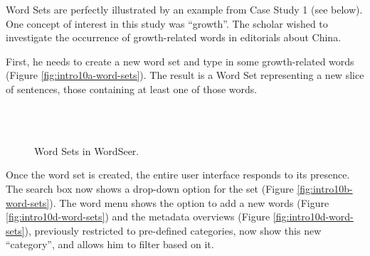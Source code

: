 \documentclass{sig-alternate}
\begin{document}
Word Sets are perfectly illustrated by an example from Case Study 1 (see below). One concept of interest in this study was ``growth''. The scholar wished to investigate the occurrence of growth-related words in editorials about China.  

First, he needs to create a new word set and type in some growth-related words (Figure \ref{fig:intro10a-word-sets}). The result is a Word Set representing a new slice of sentences, those containing at least one of those words. 

\begin{figure}[ht!]
\begin{center}
%
        \\
         \\
        \quad
%
    \end{center}
    \caption{%
       Word Sets in WordSeer. \label{fig:intro10-word-sets}
     }%
\end{figure}
Once the word set is created, the entire user interface responds to its presence. The search box now shows a drop-down option for the set  (Figure \ref{fig:intro10b-word-sets}).  The word menu shows the option to add a new words (Figure \ref{fig:intro10d-word-sets}) and the metadata overviews (Figure \ref{fig:intro10d-word-sets}), previously restricted to pre-defined categories,  now show this new ``category'', and allows him to filter based on it.   
\end{document}
